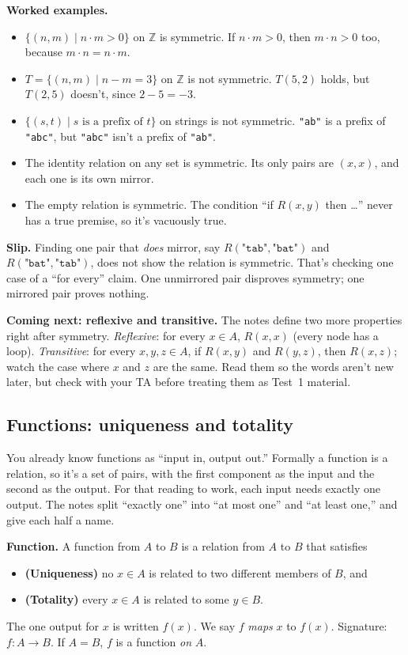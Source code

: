 \textbf{Worked examples.}
\begin{itemize}
\item $\{(n,m)\mid n\cdot m>0\}$ on $\mathbb{Z}$ is symmetric. If $n\cdot m>0$, then $m\cdot n>0$ too, because $m\cdot n=n\cdot m$.
\item $T=\{(n,m)\mid n-m=3\}$ on $\mathbb{Z}$ is not symmetric. $T(5,2)$ holds, but $T(2,5)$ doesn't, since $2-5=-3$.
\item $\{(s,t)\mid s \text{ is a prefix of } t\}$ on strings is not symmetric. \texttt{"ab"} is a prefix of \texttt{"abc"}, but \texttt{"abc"} isn't a prefix of \texttt{"ab"}.
\item The identity relation on any set is symmetric. Its only pairs are $(x,x)$, and each one is its own mirror.
\item The empty relation is symmetric. The condition ``if $R(x,y)$ then \dots'' never has a true premise, so it's vacuously true.
\end{itemize}

\textbf{Slip.} Finding one pair that \emph{does} mirror, say $R(\texttt{"tab"},\texttt{"bat"})$ and $R(\texttt{"bat"},\texttt{"tab"})$, does not show the relation is symmetric. That's checking one case of a ``for every'' claim. One unmirrored pair disproves symmetry; one mirrored pair proves nothing.

\textbf{Coming next: reflexive and transitive.} The notes define two more properties right after symmetry. \emph{Reflexive}: for every $x\in A$, $R(x,x)$ (every node has a loop). \emph{Transitive}: for every $x,y,z\in A$, if $R(x,y)$ and $R(y,z)$, then $R(x,z)$; watch the case where $x$ and $z$ are the same. Read them so the words aren't new later, but check with your TA before treating them as Test~1 material.

\subsection{Functions: uniqueness and totality}

You already know functions as ``input in, output out.'' Formally a function is a relation, so it's a set of pairs, with the first component as the input and the second as the output. For that reading to work, each input needs exactly one output. The notes split ``exactly one'' into ``at most one'' and ``at least one,'' and give each half a name.

\begin{notebox}
\textbf{Function.} A function from $A$ to $B$ is a relation from $A$ to $B$ that satisfies
\begin{itemize}
\item \textbf{(Uniqueness)} no $x\in A$ is related to two different members of $B$, and
\item \textbf{(Totality)} every $x\in A$ is related to some $y\in B$.
\end{itemize}
The one output for $x$ is written $f(x)$. We say $f$ \emph{maps} $x$ to $f(x)$. Signature: $f:A\to B$. If $A=B$, $f$ is a function \emph{on} $A$.
\end{notebox}

